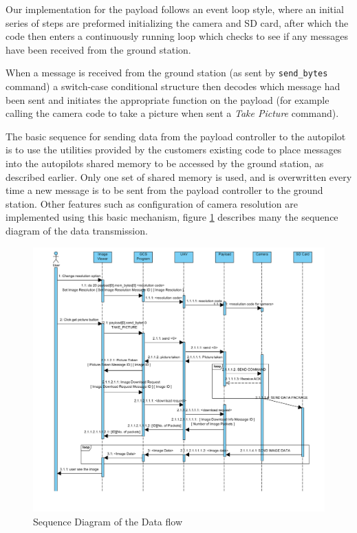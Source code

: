Our implementation for the payload follows an event loop style, where an initial series of 
steps are preformed initializing the camera and SD card, after which the code then enters a continuously
running loop which checks to see if any messages have been received from the ground station.

When a message is received from the ground station (as sent by \verb+send_bytes+ command) a switch-case
conditional structure then decodes which message had been sent and
initiates the appropriate function on the payload (for example calling the camera code to take a picture when sent
a \emph{Take Picture} command).



The basic sequence for sending data from the payload controller to the autopilot is to use the utilities provided 
by the customers existing code to place messages into the autopilots shared memory to be accessed by the
ground station, as described earlier. Only one set of shared memory is used, and is overwritten every time 
a new message is to be sent from the payload controller to the ground station.
Other features such as configuration of camera resolution are implemented using this basic mechanism, figure \ref{sequence diagram} describes many the sequence diagram of the data transmission.


\begin{figure}[H]
\begin{center}
\includegraphics[width=1.00\textwidth]{figures/sequence_diagram.png} 
\end{center}
\caption{Sequence Diagram of the Data flow\label{sequence diagram}}
\end{figure}

